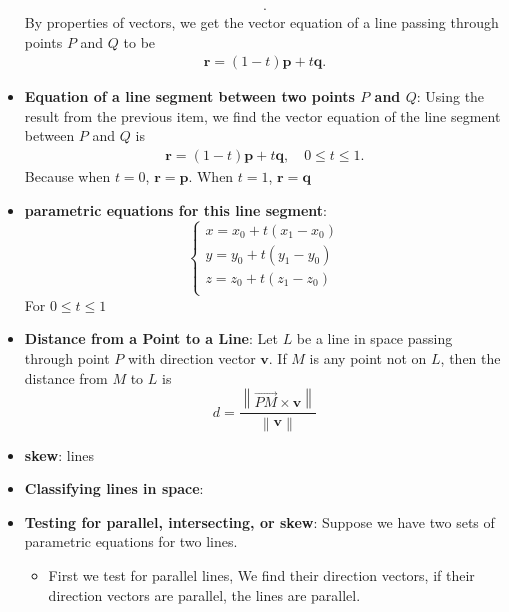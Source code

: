 \documentclass{report}
\begin{document}
\begin{itemize}
\begin{align*}
            .\end{align*} 
            By properties of vectors, we get the vector equation of a line passing through points $P$ and $Q$ to be 
            \begin{align*}
                \mathbf{r} = (1-t)\mathbf{p} + t\mathbf{q}
            .\end{align*}
        \item \textbf{Equation of a line segment between two points $P$ and $Q$}: Using the result from the previous item, we find the vector equation of the line segment between  $P$ and $Q$ is
            \begin{align*}
                \mathbf{r} = (1-t)\mathbf{p} + t\mathbf{q}, \quad 0 \leq t \leq 1
            .\end{align*}
            \bigbreak \noindent 
            Because when $t=0$, $\mathbf{r} = \mathbf{p}$. When $t=1$, $\mathbf{r}=\mathbf{q}$
        \item \textbf{parametric equations for this line segment}:
               \begin{equation}
                    \begin{cases}
                        x =  x_{0}+ t(x_{1} - x_{0})\\
                        y =  y_{0}+ t(y_{1} - y_{0})\\
                        z =  z_{0}+ t(z_{1} - z_{0})\\
                    \end{cases}
                \end{equation}
            For $0 \leq t \leq 1 $
        \item \textbf{Distance from a Point to a Line}:
            Let $L$ be a line in space passing through point $P$ with direction vector $\mathbf{v}$. If $M$ is any point not on $L$, then the distance from $M$ to $L$ is
            \[
                d = \frac{\left\| \overrightarrow{PM} \times \mathbf{v} \right\|}{\left\| \mathbf{v} \right\|}
            \]
        \item \textbf{skew}: lines
        \item \textbf{Classifying lines in space}:
            \bigbreak \noindent 
        \item \textbf{Testing for parallel, intersecting, or skew}: Suppose we have two sets of parametric equations for two lines.
            \begin{itemize}
                \item First we test for parallel lines, We find their direction vectors, if their direction vectors are parallel, the lines are parallel.

\end{itemize}
\end{itemize}
\end{document}
